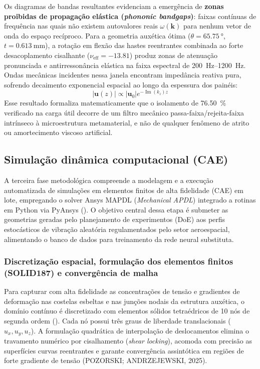 Os diagramas de bandas resultantes evidenciam a emergência de \textbf{zonas proibidas de propagação elástica (\textit{phononic bandgaps})}: faixas contínuas de frequência nas quais não existem autovalores reais $\omega(\mathbf{k})$ para nenhum vetor de onda do espaço recíproco. Para a geometria auxética ótima ($\theta = \SI{65.75}{\degree}$, $t = \SI{0.613}{\milli\metre}$), a rotação em flexão das hastes reentrantes combinada ao forte desacoplamento cisalhante ($\nu_{\text{eff}} = \num{-13.81}$) produz zonas de atenuação pronunciada e antirressonância elástica na faixa espectral de \SIrange{200}{1200}{\hertz}. Ondas mecânicas incidentes nessa janela encontram impedância reativa pura, sofrendo decaimento exponencial espacial ao longo da espessura dos painéis:
\begin{equation}
  |\mathbf{u}(z)| \propto |\mathbf{u}_0| e^{-\operatorname{Im}(k_z) z}
  \label{eq:atenuacao-exp}
\end{equation}
Esse resultado formaliza matematicamente que o isolamento de \SI{76.50}{\percent} verificado na carga útil decorre de um filtro mecânico passa-faixa/rejeita-faixa intrínseco à microestrutura metamaterial, e não de qualquer fenômeno de atrito ou amortecimento viscoso artificial.

\subsection{Simulação dinâmica computacional (CAE)}
\label{subsec:cae}

A terceira fase metodológica compreende a modelagem e a execução automatizada de simulações em elementos finitos de alta fidelidade (CAE) em lote, empregando o solver Ansys MAPDL (\textit{Mechanical APDL}) integrado a rotinas em Python via PyAnsys (). O objetivo central dessa etapa é submeter as geometrias geradas pelo planejamento de experimentos (DoE) aos perfis estocásticos de vibração aleatória regulamentados pelo setor aeroespacial, alimentando o banco de dados para treinamento da rede neural substituta.

\subsubsection{Discretização espacial, formulação dos elementos finitos (SOLID187) e convergência de malha}
\label{subsubsec:solid187}

Para capturar com alta fidelidade as concentrações de tensão e gradientes de deformação nas costelas esbeltas e nas junções nodais da estrutura auxética, o domínio contínuo é discretizado com elementos sólidos tetraédricos de 10 nós de segunda ordem (). Cada nó possui três graus de liberdade translacionais ($u_x, u_y, u_z$). A formulação quadrática de interpolação de deslocamentos elimina o travamento numérico por cisalhamento (\textit{shear locking}), acomoda com precisão as superfícies curvas reentrantes e garante convergência assintótica em regiões de forte gradiente de tensão (POZORSKI; ANDRZEJEWSKI, 2025).

